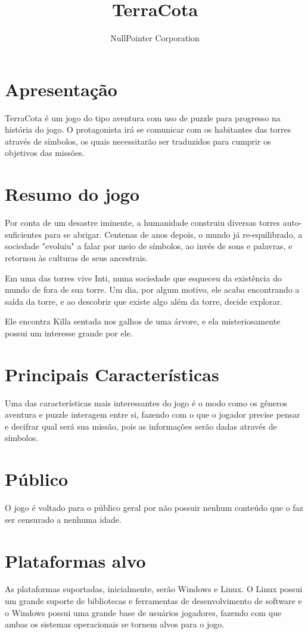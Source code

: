 \documentclass[11pt]{article}
\begin{document}
\title{TerraCota}
\author{NullPointer Corporation}
\date{}
\maketitle

\newpage

\tableofcontents
\newpage
\section{Apresentação}
TerraCota é um jogo do tipo aventura com uso de puzzle para progresso na história do jogo.  O protagonista irá se comunicar com os habitantes das torres através de símbolos, os quais necessitarão ser traduzidos para cumprir os objetivos das missões.

\section{Resumo do jogo}
Por conta de um desastre iminente, a humanidade construiu diversas torres auto-suficientes para se abrigar.
Centenas de anos depois, o mundo já re-equilibrado, a sociedade "evoluiu" a falar por meio de símbolos, ao invés de sons e palavras, e retornou às culturas de seus ancestrais.

Em uma das torres vive Inti, numa sociedade que esqueceu da existência do mundo de fora de sua torre.
Um dia, por algum motivo, ele acaba encontrando a saída da torre, e ao descobrir que existe algo além da torre, decide explorar.

Ele encontra Killa sentada nos galhos de uma árvore, e ela misteriosamente possui um interesse grande por ele.

\section{Principais Características}
Uma das características mais interessantes do jogo é o modo como os gêneros aventura e puzzle interagem entre si, fazendo com o que o jogador precise pensar e decifrar qual será sua missão, pois as informações serão dadas através de símbolos.

\section{Público}
O jogo é voltado para o público geral por não possuir nenhum conteúdo que o faz ser censurado a nenhuma idade.
\section{Plataformas alvo}
As plataformas suportadas, inicialmente, serão Windows e Linux.
O Linux possui um grande suporte de bibliotecas e ferramentas de desenvolvimento de software e o Windows possui uma grande base de usuários jogadores, fazendo com que ambas os sistemas operacionais se tornem alvos para o jogo.
\end{document}
